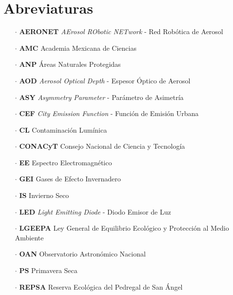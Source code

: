 \chapter{Abreviaturas}

\begin{itemize}

\item[$\cdot$] \textbf{AERONET} \textit{AErosol RObotic NETwork} - Red Robótica de Aerosol

\item[$\cdot$] \textbf{AMC} Academia Mexicana de Ciencias

\item[$\cdot$] \textbf{ANP} Áreas Naturales Protegidas

\item[$\cdot$] \textbf{AOD} \textit{Aerosol Optical Depth} - Espesor Óptico de Aerosol

\item[$\cdot$] \textbf{ASY} \textit{Asymmetry Parameter} - Parámetro de Asimetría

\item[$\cdot$] \textbf{CEF} \textit{City Emission Function} - Función de Emisión Urbana

\item[$\cdot$] \textbf{CL} Contaminación Lumínica

\item[$\cdot$] \textbf{CONACyT} Consejo Nacional de Ciencia y Tecnología

\item[$\cdot$] \textbf{EE} Espectro Electromagnético

\item[$\cdot$] \textbf{GEI} Gases de Efecto Invernadero

\item[$\cdot$] \textbf{IS} Invierno Seco

\item[$\cdot$] \textbf{LED} \textit{Light Emitting Diode} - Diodo Emisor de Luz

\item[$\cdot$] \textbf{LGEEPA} Ley General de Equilibrio Ecológico y Protección al Medio Ambiente

\item[$\cdot$] \textbf{OAN} Observatorio Astronómico Nacional

\item[$\cdot$] \textbf{PS} Primavera Seca

\item[$\cdot$] \textbf{REPSA} Reserva Ecológica del Pedregal de San Ángel


\end{itemize}
